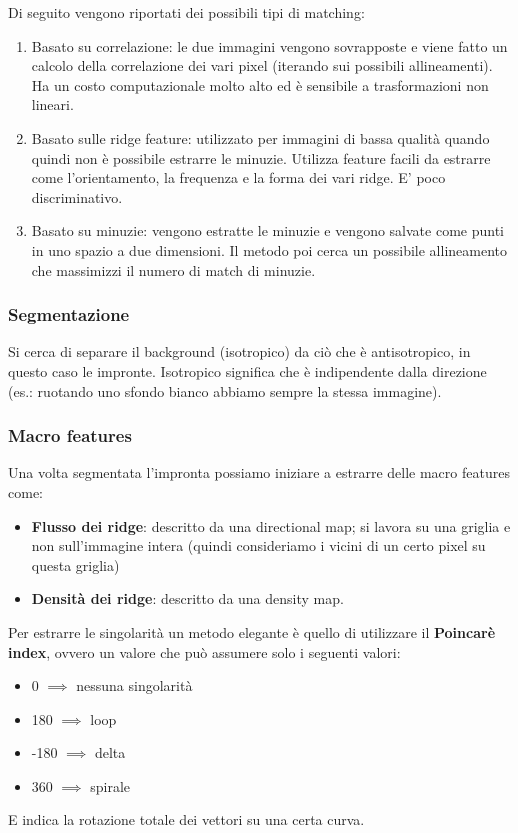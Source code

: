 \documentclass{article}
\begin{document}
Di seguito vengono riportati dei possibili tipi di matching:
\begin{enumerate}
    \item Basato su correlazione: le due immagini vengono sovrapposte e viene fatto un calcolo della correlazione dei vari pixel (iterando sui possibili allineamenti). Ha un costo computazionale molto alto ed è sensibile a trasformazioni non lineari.
    \item Basato sulle ridge feature: utilizzato per immagini di bassa qualità quando quindi non è possibile estrarre le minuzie. Utilizza feature facili da estrarre come l'orientamento, la frequenza e la forma dei vari ridge. E' poco discriminativo.
    \item Basato su minuzie: vengono estratte le minuzie e vengono salvate come punti in uno spazio a due dimensioni. Il metodo poi cerca un possibile allineamento che massimizzi il numero di match di minuzie.
\end{enumerate}

\subsubsection{Segmentazione}
Si cerca di separare il background (isotropico) da ciò che è antisotropico, in questo caso le impronte. Isotropico significa che è indipendente dalla direzione (es.: ruotando uno sfondo bianco abbiamo sempre la stessa immagine).


\subsubsection{Macro features}
Una volta segmentata l'impronta possiamo iniziare a estrarre delle macro features come:
\begin{itemize}
    \item \textbf{Flusso dei ridge}: descritto da una directional map; si lavora su una griglia e non sull'immagine intera (quindi consideriamo i vicini di un certo pixel su questa griglia)
    \item \textbf{Densità dei ridge}: descritto da una density map.
\end{itemize}

Per estrarre le singolarità un metodo elegante è quello di utilizzare il \textbf{Poincarè index}, ovvero un valore che può assumere solo i seguenti valori:
\begin{itemize}
    \item 0 $\implies$ nessuna singolarità
    \item 180 $\implies$ loop
    \item -180 $\implies$ delta
    \item 360 $\implies$ spirale
\end{itemize}
E indica la rotazione totale dei vettori su una certa curva.
\end{document}
